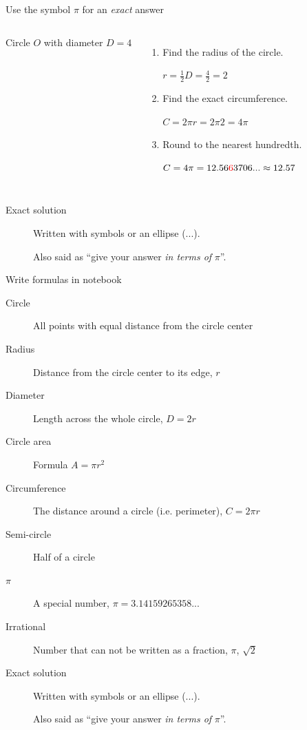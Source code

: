 \documentclass[onlytextwidth]{beamer}
\begin{document}
\begin{frame}{Use the symbol $\pi$ for an \emph{exact} answer}
    \begin{columns}
        Circle $O$ with diameter $D=4$
        \begin{enumerate}
            \item Find the radius of the circle. \par \medskip
              {$r = \frac{1}{2}D = \frac{4}{2} =2 $} \medskip
            \item Find the exact circumference. \par \medskip
              {$C = 2 \pi r = 2 \pi 2 = 4 \pi $} \medskip
            \item Round to the nearest hundredth. \par \medskip
              $C = 4 \pi = 12.56{\color{red}6}3706... \approx 12.57 $
        \end{enumerate}
    \end{columns} \vspace{2cm}
    \begin{description}
        \item[Exact solution] Written with symbols or an ellipse ($...$). \par 
        Also said as ``give your answer \emph{in terms of} $\pi$''.
    \end{description}
    \end{frame}
    
\begin{frame}{Write formulas in notebook}
    \begin{description}
        \item[Circle] All points with equal distance from the circle center
        \item[Radius] Distance from the circle center to its edge, $r$
        \item[Diameter] Length across the whole circle, $D=2r$        
        \item[Circle area] Formula $A=\pi r^2$
        \item[Circumference] The distance around a circle (i.e. perimeter), $C=2\pi r$
        \item[Semi-circle] Half of a circle
        \item[{\Large $\pi$}] A special number, $\pi = 3.14159265358...$
        \item[Irrational] Number that can not be written as a fraction, $\pi$, $\sqrt{2}$
        \item[Exact solution] Written with symbols or an ellipse ($...$). \par 
        Also said as ``give your answer \emph{in terms of} $\pi$''.
        \end{description}
    \end{frame}
\end{document}
